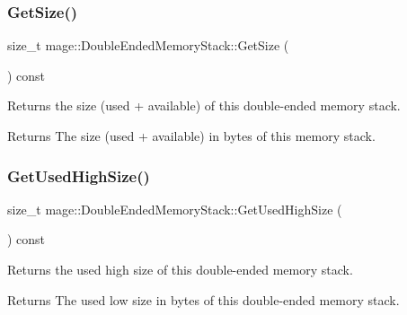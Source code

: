 \subsubsection{\texorpdfstring{Get\+Size()}{GetSize()}}
{\footnotesize\ttfamily size\+\_\+t mage\+::\+Double\+Ended\+Memory\+Stack\+::\+Get\+Size (\begin{DoxyParamCaption}{ }\end{DoxyParamCaption}) const\hspace{0.3cm}{\ttfamily [noexcept]}}

Returns the size (used + available) of this double-\/ended memory stack.

\begin{DoxyReturn}{Returns}
The size (used + available) in bytes of this memory stack. 
\end{DoxyReturn}
\hypertarget{classmage_1_1_double_ended_memory_stack_a1c037a0084cfa806c6a519fd3208cd49}{}\label{classmage_1_1_double_ended_memory_stack_a1c037a0084cfa806c6a519fd3208cd49} 
\subsubsection{\texorpdfstring{Get\+Used\+High\+Size()}{GetUsedHighSize()}}
{\footnotesize\ttfamily size\+\_\+t mage\+::\+Double\+Ended\+Memory\+Stack\+::\+Get\+Used\+High\+Size (\begin{DoxyParamCaption}{ }\end{DoxyParamCaption}) const\hspace{0.3cm}{\ttfamily [noexcept]}}

Returns the used high size of this double-\/ended memory stack.

\begin{DoxyReturn}{Returns}
The used low size in bytes of this double-\/ended memory stack. 
\end{DoxyReturn}
\hypertarget{classmage_1_1_double_ended_memory_stack_af7fd015832d8c6c56619917492e62a2e}{}\label{classmage_1_1_double_ended_memory_stack_af7fd015832d8c6c56619917492e62a2e} 
